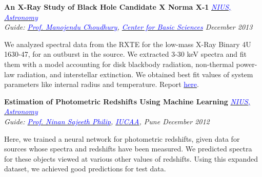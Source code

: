 \documentclass[margin,line]{res}
\newenvironment{list1}{
  \begin{list}{\ding{113}}{%
      \setlength{\itemsep}{0in}
      \setlength{\parsep}{0in} \setlength{\parskip}{0in}
      \setlength{\topsep}{0in} \setlength{\partopsep}{0in} 
      \setlength{\leftmargin}{0.17in}}}{\end{list}}
\begin{document}
\begin{resume}
{\bf An X-Ray Study of Black Hole Candidate X Norma X-1} \hfill \textit{\href{http://nius.hbcse.tifr.res.in/}{\textcolor{blue} {NIUS, Astronomy}}} \\
{\em Guide: \href{http://cbs.ac.in/people/visiting-scientists/manojendu-choudhury}{\textcolor{blue}{Prof. Manojendu Choudhury}}, \href{http://cbs.ac.in/}{\textcolor{blue} {Center for Basic Sciences}} \hfill December 2013} \\
\vspace*{-.15in}
\begin{list1}
\item[] We analyzed spectral data from the RXTE for the low-mass X-Ray Binary 4U 1630-47, for an outburst in the source. We extracted 3-30 keV spectra and fit them with a model accounting for disk blackbody radiation, non-thermal power-law radiation, and interstellar extinction. We obtained best fit values of system parameters like internal radius and temperature. Report \href{https://alankarkotwal.github.io/4U_1630-47_Report.pdf}{\textcolor{blue} {here}}.
\end{list1}

\vspace*{-0.1in}

{\bf Estimation of Photometric Redshifts Using Machine Learning} \hfill \textit{\href{http://nius.hbcse.tifr.res.in/}{\textcolor{blue} {NIUS, Astronomy}}} \\
{\em Guide: \href{http://www.iucaa.ernet.in/~nspp/}{\textcolor{blue}{Prof. Ninan Sajeeth Philip}}, \href{http://www.iucaa.ernet.in/}{\textcolor{blue} {IUCAA}}, Pune \hfill December 2012} \\
\vspace*{-.15in}
\begin{list1}
\item[] Here, we trained a neural network for photometric redshifts, given data for sources whose spectra and redshifts have been measured. We predicted spectra for these objects viewed at various other values of redshifts. Using this expanded dataset, we achieved good predictions for test data.
\end{list1}


\end{resume}
\end{document}
